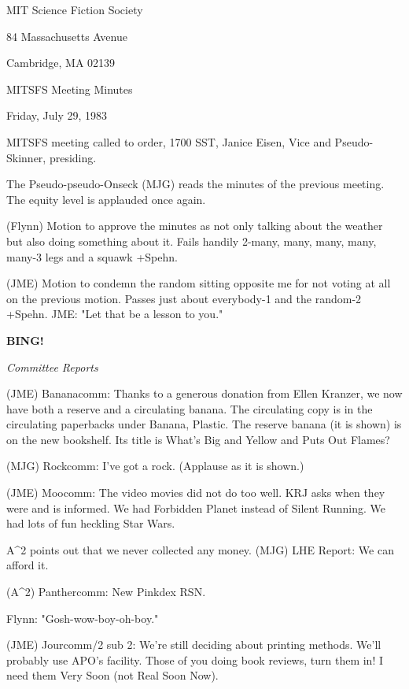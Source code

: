 \documentclass[12pt]{article}
\newcommand{\bing}{{\bf BING!} }
\newcommand{\goto}[1]{\bing \vskip 12pt \centerline{{\em{#1}}}}
\begin{document}
\begin{center}

MIT Science Fiction Society 

84 Massachusetts Avenue

Cambridge, MA 02139

\vspace{12pt}

MITSFS Meeting Minutes 

Friday, July 29, 1983

\end{center}
 
\vspace{18pt}

\setlength{\parskip}{6pt}

\noindent
MITSFS meeting called to order, 1700 SST,
Janice Eisen, Vice and Pseudo-Skinner, presiding.

The Pseudo-pseudo-Onseck (MJG) reads the minutes of the previous meeting. The equity level is applauded once again.

(Flynn) Motion to approve the minutes as not only talking about the weather but also doing something about it. Fails handily 2-many, many, many, many, many-3 legs and a squawk +Spehn.

(JME) Motion to condemn the random sitting opposite me for not voting at all on the previous motion. Passes just about everybody-1 and the random-2 +Spehn. JME: "Let that be a lesson to you."

\goto{Committee Reports}

(JME) Bananacomm: Thanks to a generous donation from Ellen Kranzer, we now have both a reserve and a circulating banana. The circulating copy is in the circulating paperbacks under Banana, Plastic. The reserve banana (it is shown) is on the new bookshelf. Its title is What's Big and Yellow and Puts Out Flames?

(MJG) Rockcomm: I've got a rock. (Applause as it is shown.)

(JME) Moocomm: The video movies did not do too well. KRJ asks when they were and is informed. We had Forbidden Planet instead of Silent Running. We had lots of fun heckling Star Wars.

A^2 points out that we never collected any money. (MJG) LHE Report: We can afford it.

(A^2) Panthercomm: New Pinkdex RSN.

Flynn: "Gosh-wow-boy-oh-boy."

(JME) Jourcomm/2 sub 2: We're still deciding about printing methods. We'll probably use APO's facility. Those of you doing book reviews, turn them in! I need them Very Soon (not Real Soon Now).
\end{document}
